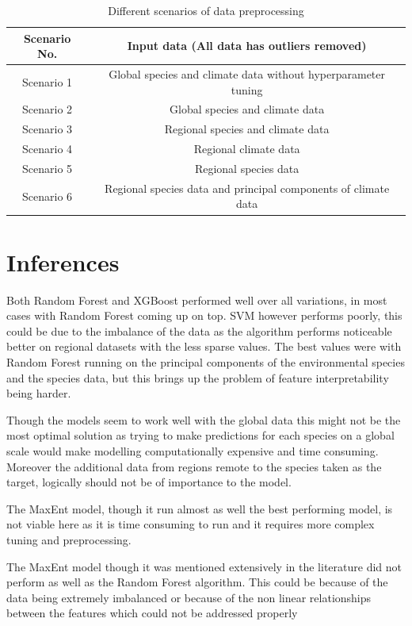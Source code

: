 \documentclass{article}
\begin{document}
\begin{table}[H]
    \centering
    \begin{tabular}{|c|c|}
\hline 
 Scenario No.& Input data (All data has outliers removed)\\ \hline 
Scenario 1 & Global species and climate data without hyperparameter tuning\\ \hline
Scenario 2 & Global species and climate data\\ \hline
Scenario 3 & Regional species and climate data\\ \hline
Scenario 4 & Regional climate data\\ \hline
Scenario 5 & Regional species data\\ \hline
Scenario 6 & Regional species data and principal components of climate data\\ \hline
    \end{tabular}
    \caption{Different scenarios of data preprocessing}
    \label{tab:Different scenarios of model runs}
\end{table}
\section{Inferences}
Both Random Forest and XGBoost performed well over all variations, in most cases with Random Forest coming up on top. SVM however performs poorly, this could be due to the imbalance of the data as the algorithm performs noticeable better on regional datasets with the less sparse values. The best values were with Random Forest running on the principal components of the environmental species and the species data, but this brings up the problem of feature interpretability being harder. 

Though the models seem to work well with the global data this might not be the most optimal solution as trying to make predictions for each species on a global scale would make modelling computationally expensive and time consuming. Moreover the additional data from regions remote to the species taken as the target, logically should not be of importance to the model.

The MaxEnt model, though it run almost as well the best performing model, is not viable here as it is time consuming to run and it requires more complex tuning and preprocessing. 

The MaxEnt model though it was mentioned extensively in the literature did not perform as well as the Random Forest algorithm. This could be because of the data being extremely imbalanced or because of the non linear relationships between the features which could not be addressed properly 
\end{document}
